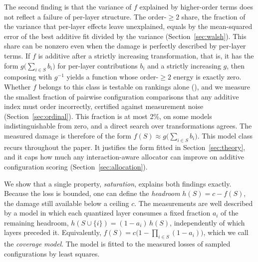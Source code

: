 The second finding is that the variance of $f$ explained by higher-order terms does not reflect a failure of per-layer structure. The
order-$\ge 2$ share, the fraction of the variance that per-layer effects leave unexplained, equals by
\thmone{} the mean-squared error of the best additive fit divided by the variance
(Section~\ref{sec:walsh}). This share can be nonzero
even when the damage is perfectly described by per-layer terms. If $f$ is additive after a strictly increasing
transformation, that is, it has the form $g\bigl(\sum_{i\in S} b_i\bigr)$ for per-layer contributions
$b_i$ and a strictly increasing $g$, then composing with $g^{-1}$ yields a function whose
order-$\ge 2$ energy is exactly zero. Whether $f$ belongs to this class is testable on rankings alone
(\thmtwo), and we measure the smallest fraction of pairwise configuration comparisons that any additive
index must order incorrectly, certified against measurement noise (Section~\ref{sec:ordinal}). This
fraction is at most 2\%, on some models indistinguishable from zero, and a direct search over
transformations agrees. The
measured damage is therefore of the form $f(S) \approx g\bigl(\sum_{i\in S} b_i\bigr)$.
This model class recurs throughout the paper. It justifies the form fitted in Section~\ref{sec:theory}, and it
caps how much any interaction-aware allocator can improve on additive configuration scoring
(Section~\ref{sec:allocation}).

We show that a single property, \emph{saturation}, explains both findings exactly. Because the loss is
bounded, one can define the \emph{headroom} $h(S) = c - f(S)$, the damage still available below a ceiling
$c$. The measurements are well described by a model in which each quantized layer consumes a fixed fraction
$a_i$ of the remaining headroom, $h(S\cup\{i\}) = (1-a_i)\,h(S)$, independently of which layers preceded
it. Equivalently, $f(S)=c\bigl(1-\prod_{i\in S}(1-a_i)\bigr)$, which we call the \emph{coverage model}.
The model is fitted to the measured losses of sampled
configurations by least squares. 

